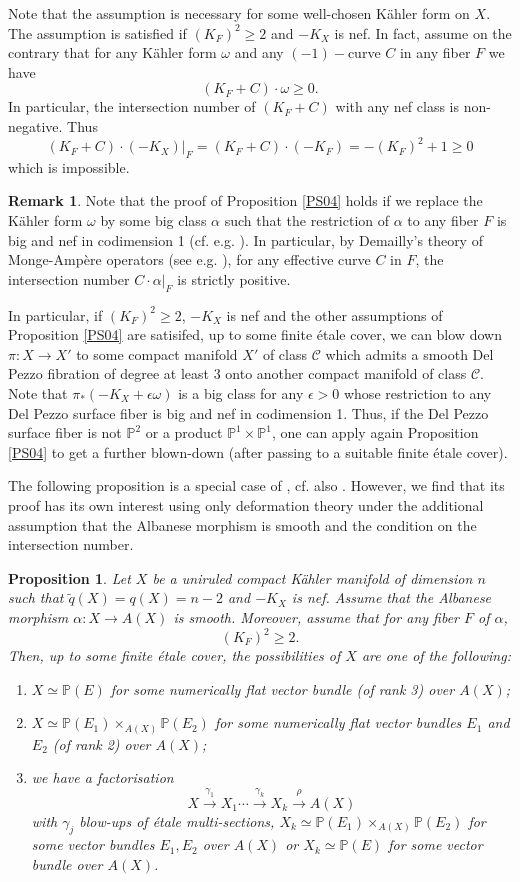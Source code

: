\documentclass[a4, 12pt]{amsart}
\newtheorem{prop}[thm]{Proposition}
\numberwithin{equation}{section}
\theoremstyle{definition}
\newtheorem{rem}[thm]{Remark}
\def\P{\mathbb{P}}
\def\P{\mathbb{P}}
\begin{document}
Note that the assumption is necessary for some well-chosen K\"ahler form on $X$.
The assumption is satisfied if $(K_F)^2 \geq 2$ and $-K_X$ is nef.
In fact, assume on the contrary that for any K\"ahler form $\omega$ and any $(-1)-$curve $C$ in any fiber $F$ we have
$$(K_F+C) \cdot \omega \geq 0.$$
In particular, the intersection number of $(K_F+C) $ with any nef class is non-negative.
Thus
$$(K_F+C) \cdot(-K_X)|_F=(K_F+C) \cdot (-K_F)=-(K_F)^2 +1\geq 0$$
which is impossible.

\begin{rem}
\label{Blow-Down}
 Note that the proof of Proposition \ref{PS04} holds if we replace the K\"ahler form $\omega$ by some big class $\alpha$ such that the restriction of $\alpha$ to any fiber $F$ is big and nef in codimension 1 (cf. e.g. \cite{nef}).
 In particular, by Demailly's theory of Monge-Amp\`ere operators  (see e.g. \cite[Section 4, Chap III]{agbook}), for any effective curve $C$ in $F$,
 the intersection number $C \cdot \alpha|_F$ is strictly positive.

 In particular, if $(K_F)^2 \geq 2$, $-K_X$ is nef and the other assumptions of Proposition \ref{PS04} are satisifed, up to some finite \'etale cover, we can blow down $\pi: X \to X'$ to some compact manifold $X'$ of class $\mathcal{C}$ which admits a smooth Del Pezzo fibration of degree at least 3 onto another compact manifold of class $\mathcal{C}$.
 Note that $\pi_*(-K_X+\epsilon \omega)$ is a big class for any $\epsilon >0$ whose restriction to any Del Pezzo surface fiber is big and nef in codimension 1.
 Thus, if the Del Pezzo surface fiber is not $\P^2$ or a product $\P^1 \times \P^1$, one can apply again Proposition \ref{PS04} to get a further blown-down (after passing to a suitable finite \'etale cover).
\end{rem}
The following proposition is a special case of \cite{CH17}, cf. also \cite[Corollary 3.4]{PS98}.
However, we find that its proof has its own interest using only deformation theory under the additional assumption that the Albanese morphism is smooth and the condition on the intersection number. 
\begin{prop}
\label{PS3.4}
 Let $X$ be a uniruled compact K\"ahler manifold of dimension $n$ such that
$\tilde{q}(X)=q(X)=n-2$ and
$-K_X$ is nef.
Assume that the Albanese morphism $\alpha: X \to A(X)$ is smooth.
Moreover, assume that for any fiber $F$ of $\alpha$,
$$(K_F)^2 \geq 2.$$
Then, up to some finite \'etale cover, the possibilities of $X$ are one of the following:
\begin{enumerate}
 \item $X \simeq \P(E)$ for some numerically flat vector bundle (of rank 3) over $A(X)$;
 \item $X \simeq \P(E_1) \times_{A(X)} \P(E_2)$ for some numerically flat vector bundles $E_1$ and $E_2$ (of rank 2) over $A(X)$;
 \item we have a factorisation
$$X \xrightarrow{\gamma_1} X_1 \cdots \xrightarrow{\gamma_k} X_k \xrightarrow{\rho}  A(X)$$
with $\gamma_j$ blow-ups of  \'etale multi-sections, $X_k \simeq \P(E_1) \times_{A(X)} \P(E_2)$ for some vector bundles $E_1,E_2$ over $A(X)$ or $X_k \simeq \P(E)$ for some vector bundle over $A(X)$.
\end{enumerate}
\end{prop}
\end{document}
